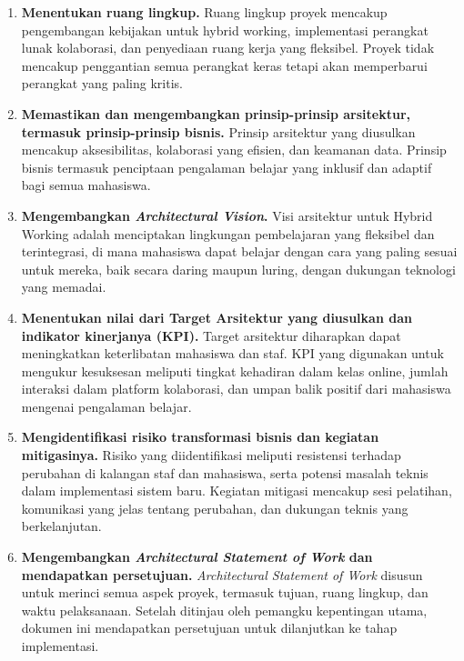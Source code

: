 \begin{enumerate}
	\item \textbf{Menentukan ruang lingkup.} 
	Ruang lingkup proyek mencakup pengembangan kebijakan untuk hybrid working, implementasi perangkat lunak kolaborasi, dan penyediaan ruang kerja yang fleksibel. Proyek tidak mencakup penggantian semua perangkat keras tetapi akan memperbarui perangkat yang paling kritis.
	
	\item \textbf{Memastikan dan mengembangkan prinsip-prinsip arsitektur, termasuk prinsip-prinsip bisnis.} 
	Prinsip arsitektur yang diusulkan mencakup aksesibilitas, kolaborasi yang efisien, dan keamanan data. Prinsip bisnis termasuk penciptaan pengalaman belajar yang inklusif dan adaptif bagi semua mahasiswa.
	
	\item \textbf{Mengembangkan \textit{Architectural Vision}.} 
	Visi arsitektur untuk Hybrid Working adalah menciptakan lingkungan pembelajaran yang fleksibel dan terintegrasi, di mana mahasiswa dapat belajar dengan cara yang paling sesuai untuk mereka, baik secara daring maupun luring, dengan dukungan teknologi yang memadai.
	
	\item \textbf{Menentukan nilai dari Target Arsitektur yang diusulkan dan indikator kinerjanya (KPI).} 
	Target arsitektur diharapkan dapat meningkatkan keterlibatan mahasiswa dan staf. KPI yang digunakan untuk mengukur kesuksesan meliputi tingkat kehadiran dalam kelas online, jumlah interaksi dalam platform kolaborasi, dan umpan balik positif dari mahasiswa mengenai pengalaman belajar.
	
	\item \textbf{Mengidentifikasi risiko transformasi bisnis dan kegiatan mitigasinya.} 
	Risiko yang diidentifikasi meliputi resistensi terhadap perubahan di kalangan staf dan mahasiswa, serta potensi masalah teknis dalam implementasi sistem baru. Kegiatan mitigasi mencakup sesi pelatihan, komunikasi yang jelas tentang perubahan, dan dukungan teknis yang berkelanjutan.
	
	\item \textbf{Mengembangkan \textit{Architectural Statement of Work} dan mendapatkan persetujuan.} 
	\textit{Architectural Statement of Work} disusun untuk merinci semua aspek proyek, termasuk tujuan, ruang lingkup, dan waktu pelaksanaan. Setelah ditinjau oleh pemangku kepentingan utama, dokumen ini mendapatkan persetujuan untuk dilanjutkan ke tahap implementasi.
\end{enumerate}



